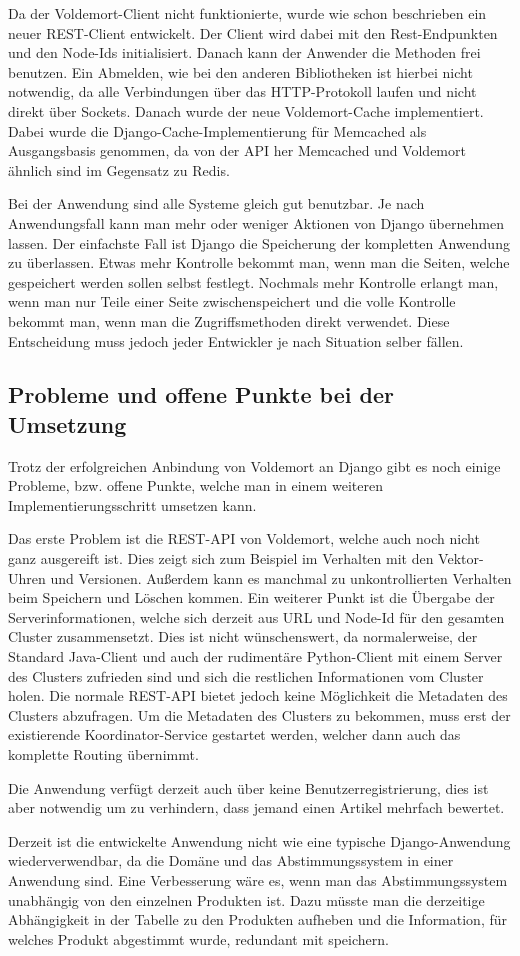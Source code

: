 Da der Voldemort-Client nicht funktionierte, wurde wie schon beschrieben ein
neuer \gls{REST}-Client entwickelt. Der Client wird dabei mit den Rest-Endpunkten und
den Node-Ids initialisiert. Danach kann der Anwender die Methoden frei benutzen.
Ein Abmelden, wie bei den anderen Bibliotheken ist hierbei nicht notwendig, da
alle Verbindungen über das HTTP-Protokoll laufen und nicht direkt über Sockets.
Danach wurde der neue Voldemort-Cache implementiert. Dabei wurde die
Django-Cache-Implementierung für Memcached als Ausgangsbasis genommen, da von
der API her Memcached und Voldemort ähnlich sind im Gegensatz zu Redis.

Bei der Anwendung sind alle Systeme gleich gut benutzbar. Je nach Anwendungsfall
kann man mehr oder weniger Aktionen von Django übernehmen lassen. Der einfachste
Fall ist Django die Speicherung der kompletten Anwendung zu überlassen. Etwas
mehr Kontrolle bekommt man, wenn man die Seiten, welche gespeichert werden
sollen selbst festlegt. Nochmals mehr Kontrolle erlangt man, wenn man nur Teile
einer Seite zwischenspeichert und die volle Kontrolle bekommt man, wenn man die
Zugriffsmethoden direkt verwendet. Diese Entscheidung muss jedoch jeder
Entwickler je nach Situation selber fällen.

\subsection{Probleme und offene Punkte bei der Umsetzung}
Trotz der erfolgreichen Anbindung von Voldemort an Django gibt es noch einige
Probleme, bzw. offene Punkte, welche man in einem weiteren
Implementierungsschritt umsetzen kann.

Das erste Problem ist die \gls{REST}-API von Voldemort, welche auch noch nicht
ganz ausgereift ist. Dies zeigt sich zum Beispiel im Verhalten mit den
Vektor-Uhren und Versionen. Außerdem kann es manchmal zu unkontrollierten
Verhalten beim  Speichern und Löschen kommen. Ein weiterer Punkt ist die Übergabe
der Serverinformationen, welche sich derzeit aus URL und Node-Id für den gesamten
Cluster zusammensetzt. Dies ist nicht wünschenswert, da normalerweise, der
Standard Java-Client und auch der rudimentäre Python-Client mit einem Server
des Clusters zufrieden sind und sich die restlichen Informationen vom Cluster
holen. Die normale REST-API bietet jedoch keine Möglichkeit die Metadaten des
Clusters abzufragen. Um die Metadaten des Clusters zu bekommen, muss erst der
existierende Koordinator-Service gestartet werden, welcher dann auch das
komplette Routing übernimmt.

Die Anwendung verfügt derzeit auch über keine Benutzerregistrierung, dies ist
aber notwendig um zu verhindern, dass jemand einen Artikel mehrfach bewertet.

Derzeit ist die entwickelte Anwendung nicht wie eine typische Django-Anwendung
wiederverwendbar, da die Domäne und das Abstimmungssystem in einer Anwendung sind.
Eine Verbesserung wäre es, wenn man das Abstimmungssystem unabhängig von den
einzelnen Produkten ist. Dazu müsste man die derzeitige Abhängigkeit in der
Tabelle zu den Produkten aufheben und die Information, für welches Produkt
abgestimmt wurde, redundant mit speichern.
